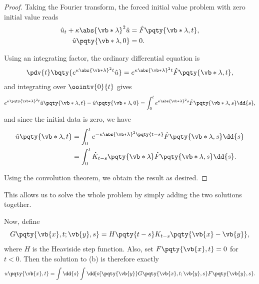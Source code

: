 \begin{proof}
    Taking the Fourier transform, the forced initial value problem with zero initial value reads
    \begin{subequations}
        \begin{align}
            \hat{u}_t + \kappa \abs{\vb*{\lambda}}^2 \hat{u} &= \hat{F} \pqty{\vb*{\lambda}, t}, \\
            \hat{u} \pqty{\vb*{\lambda}, 0} &= 0.
        \end{align}
    \end{subequations}

    Using an integrating factor, the ordinary differential equation is
    \begin{equation}
        \pdv{t} \bqty{e^{\kappa \abs{\vb*{\lambda}}^2 t} \hat{u}} = e^{\kappa \abs{\vb*{\lambda}}^2 t} \hat{F} \pqty{\vb*{\lambda}, t},
    \end{equation}
    and integrating over \(\oointv{0}{t}\) gives
    \begin{equation}
        e^{\kappa \pqty{\vb*{\lambda}}^2 t} \hat{u} \pqty{\vb*{\lambda}, t} - \hat{u} \pqty{\vb*{\lambda}, 0} = \int_{0}^{t} e^{\kappa \abs{\vb*{\lambda}}^2 s} \hat{F} \pqty{\vb*{\lambda}, s} \dd{s},
    \end{equation}
    and since the initial data is zero, we have
    \begin{subequations}
        \begin{align}
            \hat{u} \pqty{\vb*{\lambda}, t} &= \int_{0}^{t} e^{- \kappa \abs{\vb*{\lambda}}^2 \pqty{t - s}} \hat{F} \pqty{\vb*{\lambda}, s} \dd{s} \\
            &= \int_{0}^{t} \hat{K}_{t - s} \pqty{\vb*{\lambda}} \hat{F} \pqty{\vb*{\lambda}, s} \dd{s}.
        \end{align}
    \end{subequations}

    Using the convolution theorem, we obtain the result as desired.
\end{proof}

This allows us to solve the whole problem by simply adding the two solutions together.

Now, define
\begin{equation}
    G\pqty{\vb{x}, t; \vb{y}, s} = H\pqty{t - s} K_{t - s} \pqty{\vb{x} - \vb{y}},
\end{equation}
where \(H\) is the Heaviside step function. Also, set \(F\pqty{\vb{x}, t} = 0\) for \(t < 0\). Then the solution to (b) is therefore exactly
\begin{equation}
    u \pqty{\vb{x}, t} = \int \dd{s} \int \dd[n]\pqty{\vb{y}} G\pqty{\vb{x}, t; \vb{y}, s} F\pqty{\vb{y}, s}.
\end{equation}

